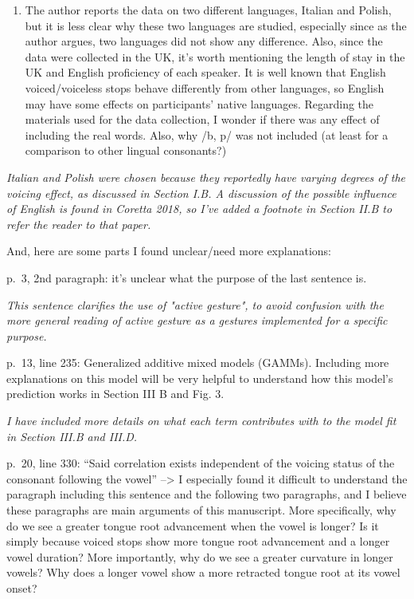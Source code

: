 \documentclass[]{article}
\providecommand{\tightlist}{%
  \setlength{\itemsep}{0pt}\setlength{\parskip}{0pt}}
\begin{document}
\begin{enumerate}
\def\labelenumi{\arabic{enumi}.}
\setcounter{enumi}{3}
\tightlist
\item
  The author reports the data on two different languages, Italian and
  Polish, but it is less clear why these two languages are studied,
  especially since as the author argues, two languages did not show any
  difference. Also, since the data were collected in the UK, it's worth
  mentioning the length of stay in the UK and English proficiency of
  each speaker. It is well known that English voiced/voiceless stops
  behave differently from other languages, so English may have some
  effects on participants' native languages. Regarding the materials
  used for the data collection, I wonder if there was any effect of
  including the real words. Also, why /b, p/ was not included (at least
  for a comparison to other lingual consonants?)
\end{enumerate}

\begin{adjustwidth}{1cm}{} \textit{
Italian and Polish were chosen because they reportedly have varying degrees of the voicing effect, as discussed in Section I.B.
A discussion of the possible influence of English is found in Coretta 2018, so I've added a footnote in Section II.B to refer the reader to that paper.
} \end{adjustwidth}

And, here are some parts I found unclear/need more explanations:

p.~3, 2nd paragraph: it's unclear what the purpose of the last sentence
is.

\begin{adjustwidth}{1cm}{} \textit{
This sentence clarifies the use of "active gesture", to avoid confusion with the more general reading of active gesture as a gestures implemented for a specific purpose.
} \end{adjustwidth}

p.~13, line 235: Generalized additive mixed models (GAMMs). Including
more explanations on this model will be very helpful to understand how
this model's prediction works in Section III B and Fig. 3.

\begin{adjustwidth}{1cm}{} \textit{
I have included more details on what each term contributes with to the model fit in Section III.B and III.D.
} \end{adjustwidth}

p.~20, line 330: ``Said correlation exists independent of the voicing
status of the consonant following the vowel'' --\textgreater{} I
especially found it difficult to understand the paragraph including this
sentence and the following two paragraphs, and I believe these
paragraphs are main arguments of this manuscript. More specifically, why
do we see a greater tongue root advancement when the vowel is longer? Is
it simply because voiced stops show more tongue root advancement and a
longer vowel duration? More importantly, why do we see a greater
curvature in longer vowels? Why does a longer vowel show a more
retracted tongue root at its vowel onset?
\end{document}
